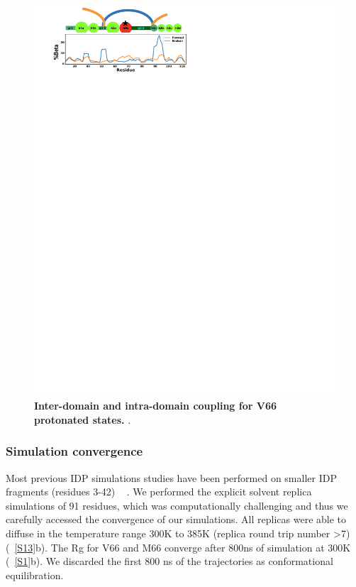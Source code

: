 \documentclass[journal=jacsat,manuscript=article]{achemso}
\begin{document}
\begin{figure}[!ht]
 \includegraphics[scale=0.5,width=\textwidth,trim={0 0cm 0 0},clip]{../figures/S12.pdf}
\caption{{\bf Inter-domain and intra-domain coupling for V66 protonated states.}
.
 }
\label{S12} 
\end{figure}
\clearpage
\subsubsection*{Simulation convergence}
Most previous IDP simulations studies have been performed on smaller IDP fragments (residues 3-42) ~\cite{Henriques, Rauscher2017, Meng2018} . We performed the explicit solvent replica simulations of 91 residues, which was computationally challenging and thus we carefully accessed the convergence of our simulations. All replicas were able to diffuse in the temperature range 300K to 385K (replica round trip number \textgreater 7) (~\ref{S13}b). The Rg for V66 and M66 converge after 800ns of simulation at 300K (~\ref{S1}b). We discarded the first 800 ns of the trajectories as conformational equilibration.
\end{document}
